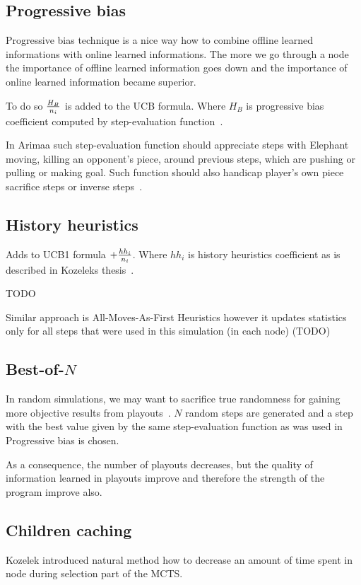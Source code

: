 \subsection{Progressive bias}
Progressive bias technique is a nice way how to combine offline learned
informations with online learned informations. The more we go through a node
the importance of offline learned information goes down and the importance of
online learned information became superior.

To do so ${H_B \over n_i}$ is added to the UCB formula. Where $H_B$ is
progressive bias coefficient computed by step-evaluation
function~\cite{progressive-strategies}.

In Arimaa such step-evaluation function should appreciate steps with Elephant
moving, killing an opponent's piece, around previous steps, which are pushing or
pulling or making goal. Such function should also handicap player's own piece
sacrifice steps or inverse steps~\cite{KOZELEK}.

\subsection{History heuristics}
Adds to UCB1 formula $+ {hh_i \over n_i}$. Where $hh_i$ is history
heuristics coefficient as is described in Kozeleks thesis~\cite{KOZELEK}.

TODO

Similar approach is All-Moves-As-First Heuristics however it updates statistics
only for all steps that were used in this simulation (in each node) (TODO)

\subsection{Best-of-$N$}
In random simulations, we may want to sacrifice true randomness for gaining
more objective results from playouts~\cite{HeavyPlayouts}. $N$ random steps are
generated and a step with the best value given by the same step-evaluation
function as was used in Progressive bias is chosen.

As a consequence, the number of playouts decreases, but the quality of
information learned in playouts improve and therefore the strength of the
program improve also.

\subsection{Children caching}
Kozelek introduced natural method how to decrease an amount of time spent in
node during selection part of the MCTS.

